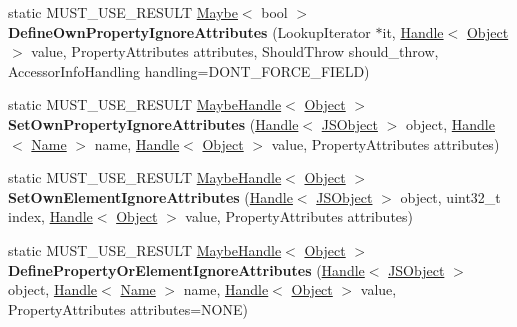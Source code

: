 \begin{DoxyCompactItemize}
\item 
static M\+U\+S\+T\+\_\+\+U\+S\+E\+\_\+\+R\+E\+S\+U\+LT \hyperlink{classv8_1_1_maybe}{Maybe}$<$ bool $>$ {\bfseries Define\+Own\+Property\+Ignore\+Attributes} (Lookup\+Iterator $\ast$it, \hyperlink{classv8_1_1internal_1_1_handle}{Handle}$<$ \hyperlink{classv8_1_1internal_1_1_object}{Object} $>$ value, Property\+Attributes attributes, Should\+Throw should\+\_\+throw, Accessor\+Info\+Handling handling=D\+O\+N\+T\+\_\+\+F\+O\+R\+C\+E\+\_\+\+F\+I\+E\+LD)\hypertarget{classv8_1_1internal_1_1_j_s_object_a852a8ac6cb14bc3bcf6c0655af212bf4}{}\label{classv8_1_1internal_1_1_j_s_object_a852a8ac6cb14bc3bcf6c0655af212bf4}

\item 
static M\+U\+S\+T\+\_\+\+U\+S\+E\+\_\+\+R\+E\+S\+U\+LT \hyperlink{classv8_1_1internal_1_1_maybe_handle}{Maybe\+Handle}$<$ \hyperlink{classv8_1_1internal_1_1_object}{Object} $>$ {\bfseries Set\+Own\+Property\+Ignore\+Attributes} (\hyperlink{classv8_1_1internal_1_1_handle}{Handle}$<$ \hyperlink{classv8_1_1internal_1_1_j_s_object}{J\+S\+Object} $>$ object, \hyperlink{classv8_1_1internal_1_1_handle}{Handle}$<$ \hyperlink{classv8_1_1internal_1_1_name}{Name} $>$ name, \hyperlink{classv8_1_1internal_1_1_handle}{Handle}$<$ \hyperlink{classv8_1_1internal_1_1_object}{Object} $>$ value, Property\+Attributes attributes)\hypertarget{classv8_1_1internal_1_1_j_s_object_a9e0a607bf7dc42d4dc0461b1b20c6359}{}\label{classv8_1_1internal_1_1_j_s_object_a9e0a607bf7dc42d4dc0461b1b20c6359}

\item 
static M\+U\+S\+T\+\_\+\+U\+S\+E\+\_\+\+R\+E\+S\+U\+LT \hyperlink{classv8_1_1internal_1_1_maybe_handle}{Maybe\+Handle}$<$ \hyperlink{classv8_1_1internal_1_1_object}{Object} $>$ {\bfseries Set\+Own\+Element\+Ignore\+Attributes} (\hyperlink{classv8_1_1internal_1_1_handle}{Handle}$<$ \hyperlink{classv8_1_1internal_1_1_j_s_object}{J\+S\+Object} $>$ object, uint32\+\_\+t index, \hyperlink{classv8_1_1internal_1_1_handle}{Handle}$<$ \hyperlink{classv8_1_1internal_1_1_object}{Object} $>$ value, Property\+Attributes attributes)\hypertarget{classv8_1_1internal_1_1_j_s_object_aeb24f48d160746218bd2298b8485890c}{}\label{classv8_1_1internal_1_1_j_s_object_aeb24f48d160746218bd2298b8485890c}

\item 
static M\+U\+S\+T\+\_\+\+U\+S\+E\+\_\+\+R\+E\+S\+U\+LT \hyperlink{classv8_1_1internal_1_1_maybe_handle}{Maybe\+Handle}$<$ \hyperlink{classv8_1_1internal_1_1_object}{Object} $>$ {\bfseries Define\+Property\+Or\+Element\+Ignore\+Attributes} (\hyperlink{classv8_1_1internal_1_1_handle}{Handle}$<$ \hyperlink{classv8_1_1internal_1_1_j_s_object}{J\+S\+Object} $>$ object, \hyperlink{classv8_1_1internal_1_1_handle}{Handle}$<$ \hyperlink{classv8_1_1internal_1_1_name}{Name} $>$ name, \hyperlink{classv8_1_1internal_1_1_handle}{Handle}$<$ \hyperlink{classv8_1_1internal_1_1_object}{Object} $>$ value, Property\+Attributes attributes=N\+O\+NE)\hypertarget{classv8_1_1internal_1_1_j_s_object_a63981809a6caec14ae40a4387973a63c}{}\label{classv8_1_1internal_1_1_j_s_object_a63981809a6caec14ae40a4387973a63c}


\end{DoxyCompactItemize}
